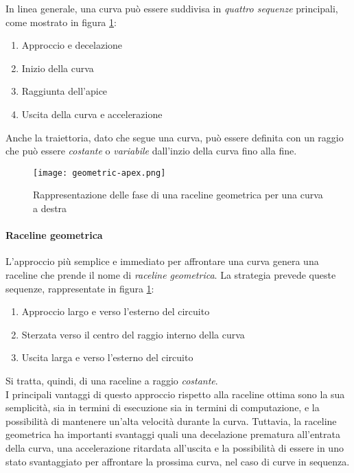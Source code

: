In linea generale, una curva può essere suddivisa in \textit{quattro sequenze} principali, come mostrato
in figura \ref{fig:geom-raceline}:
\begin{enumerate}
	\item Approccio e decelazione
	\item Inizio della curva
	\item Raggiunta dell'apice
	\item Uscita della curva e accelerazione
\end{enumerate}

Anche la traiettoria, dato che segue una curva, può essere definita con un raggio che può essere
\textit{costante} o \textit{variabile} dall'inzio della curva fino alla fine.

\begin{figure}[H]
	\begin{center}
		\texttt{[image: geometric-apex.png]}
	\end{center}
	\caption{Rappresentazione delle fase di una raceline geometrica per una curva a destra}
	\label{fig:geom-raceline}
\end{figure}

\paragraph{Raceline geometrica}
L'approccio più semplice e immediato per affrontare una curva genera una raceline che prende il
nome di \textit{raceline geometrica}. La strategia prevede queste sequenze, rappresentate in figura
\ref{fig:geom-raceline}:
\begin{enumerate}
	\item Approccio largo e verso l'esterno del circuito
	\item Sterzata verso il centro del raggio interno della curva
	\item Uscita larga e verso l'esterno del circuito
\end{enumerate}
Si tratta, quindi, di una raceline a raggio \textit{costante}.\\
I principali vantaggi di questo approccio rispetto alla raceline ottima sono la sua semplicità, sia in
termini di esecuzione sia in termini di computazione, e la possibilità di mantenere un'alta velocità
durante la curva. Tuttavia, la raceline geometrica ha importanti svantaggi quali una decelazione
prematura all'entrata della curva, una accelerazione ritardata all'uscita e la possibilità di essere in
uno stato svantaggiato per affrontare la prossima curva, nel caso di curve in sequenza.

